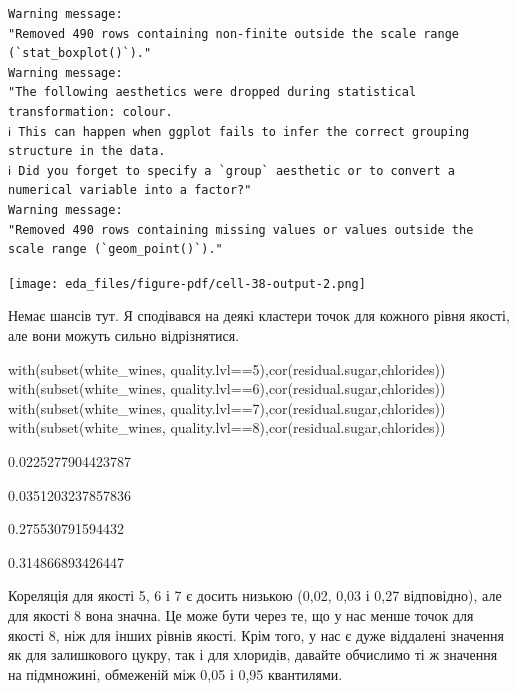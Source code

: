 \documentclass[
  letterpaper,
  DIV=11,
  numbers=noendperiod]{scrreprt}
\newenvironment{Shaded}{\begin{snugshade}}{\end{snugshade}}
\newcommand{\DecValTok}[1]{\textcolor[rgb]{0.68,0.00,0.00}{#1}}
\newcommand{\FunctionTok}[1]{\textcolor[rgb]{0.28,0.35,0.67}{#1}}
\newcommand{\NormalTok}[1]{\textcolor[rgb]{0.00,0.23,0.31}{#1}}
\newcommand{\SpecialCharTok}[1]{\textcolor[rgb]{0.37,0.37,0.37}{#1}}
\begin{document}
\begin{verbatim}
Warning message:
"Removed 490 rows containing non-finite outside the scale range (`stat_boxplot()`)."
Warning message:
"The following aesthetics were dropped during statistical transformation: colour.
ℹ This can happen when ggplot fails to infer the correct grouping structure in the data.
ℹ Did you forget to specify a `group` aesthetic or to convert a numerical variable into a factor?"
Warning message:
"Removed 490 rows containing missing values or values outside the scale range (`geom_point()`)."
\end{verbatim}

\texttt{[image: eda\_files/figure-pdf/cell-38-output-2.png]}

Немає шансів тут. Я сподівався на деякі кластери точок для кожного рівня
якості, але вони можуть сильно відрізнятися.

\begin{Shaded}
\begin{Highlighting}[]
\FunctionTok{with}\NormalTok{(}\FunctionTok{subset}\NormalTok{(white\_wines, quality.lvl}\SpecialCharTok{==}\DecValTok{5}\NormalTok{),}\FunctionTok{cor}\NormalTok{(residual.sugar,chlorides))}
\FunctionTok{with}\NormalTok{(}\FunctionTok{subset}\NormalTok{(white\_wines, quality.lvl}\SpecialCharTok{==}\DecValTok{6}\NormalTok{),}\FunctionTok{cor}\NormalTok{(residual.sugar,chlorides))}
\FunctionTok{with}\NormalTok{(}\FunctionTok{subset}\NormalTok{(white\_wines, quality.lvl}\SpecialCharTok{==}\DecValTok{7}\NormalTok{),}\FunctionTok{cor}\NormalTok{(residual.sugar,chlorides))}
\FunctionTok{with}\NormalTok{(}\FunctionTok{subset}\NormalTok{(white\_wines, quality.lvl}\SpecialCharTok{==}\DecValTok{8}\NormalTok{),}\FunctionTok{cor}\NormalTok{(residual.sugar,chlorides))}
\end{Highlighting}
\end{Shaded}

0.0225277904423787

0.0351203237857836

0.275530791594432

0.314866893426447

Кореляція для якості 5, 6 і 7 є досить низькою (0,02, 0,03 і 0,27
відповідно), але для якості 8 вона значна. Це може бути через те, що у
нас менше точок для якості 8, ніж для інших рівнів якості. Крім того, у
нас є дуже віддалені значення як для залишкового цукру, так і для
хлоридів, давайте обчислимо ті ж значення на підмножині, обмеженій між
0,05 і 0,95 квантилями.
\end{document}
